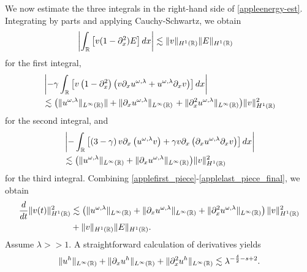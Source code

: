 %
%
We now estimate the three integrals in the right-hand side of 
\eqref{appleenergy-est}. Integrating by parts and applying Cauchy-Schwartz,  
we obtain
%
%
%
\begin{equation}
\begin{split}
\label{applefirst_piece}
& \left |\int_{\mathbb{R}} \left [v (1- \partial_x^2)E \right ] dx \right |
\lesssim
\|v\|_{H^1(\mathbb{R})} \|E\|_{H^1(\mathbb{R})}
\end{split}
\end{equation}
for the first integral,
%
%
\begin{equation}
\begin{split}
\label{applesecond-piece-final}
& \left | -\gamma \int_{\mathbb{R}}
\left[ v\left( 1-\partial_x^2 \right)\left( v \partial_x u^{\omega,\lambda} + 
u^{\omega,\lambda} \partial_x v
\right) \right] dx \right |
\\
& \lesssim \left( \|u^{\omega,\lambda}\|_{L^\infty(\mathbb{R})}\| + \|\partial_x 
u^{\omega,\lambda}
\|_{L^\infty(\mathbb{R})} \right .  + \|\partial_x^2 u^{\omega,\lambda} 
\|_{L^\infty(\mathbb{R})}
\big )\|v\|_{H^1(\mathbb{R})}^2
\end{split}
\end{equation}
for the second integral, and
\begin{equation}
\begin{split}
\label{applelast_piece_final}
& \left | -\int_{\mathbb{R}} \left[ \left( 3-\gamma \right)v
\partial_x \left( u^{\omega,\lambda} v \right) + \gamma
v \partial_x \left( \partial_x u^{\omega,\lambda} \partial_x v \right)\right]dx \right |
\\
& \lesssim \big(
\|u^{\omega,\lambda}\|_{L^\infty(\mathbb{R})}
+ \|\partial_x u^{\omega,\lambda} \|_{L^\infty(\mathbb{R})} \big)
\|v\|_{H^1(\mathbb{R})}^2
\end{split}
\end{equation}
%
%
%
for the third integral. Combining 
\eqref{applefirst_piece}-\eqref{applelast_piece_final}, we 
obtain
%
%
\begin{equation}
\begin{split}
\label{appleenergy-estimate-best}
\frac{d}{dt} \|v(t)\|_{H^1(\mathbb{R})}^2
& \lesssim \left( \|u^{\omega,\lambda}\|_{L^\infty(\mathbb{R})} + \|
\partial_x u^{\omega,\lambda} \|_{L^\infty(\mathbb{R})} + \|\partial_x^2 u^{\omega,\lambda} 
\|_{L^\infty (\mathbb{R})} \right)
\|v\|_{H^1(\mathbb{R})}^2 \\
&+ \|v\|_{H^1(\mathbb{R})} \|E\|_{H^1(\mathbb{R})}.
\end{split}
\end{equation}
%
%
Assume $\lambda >>1$. A straightforward calculation of derivatives yields
%
%
\begin{equation*}
\begin{split}
\|u^h\|_{L^\infty(\mathbb{R})} + \|\partial_x u^h\|_{L^\infty(\mathbb{R})} + \|\partial_x^2
u^h\|_{L^\infty(\mathbb{R})} \lesssim \lambda^{- \frac{\delta}{2} - s +2 }.
\label{apple53}
\end{split}
\end{equation*}
